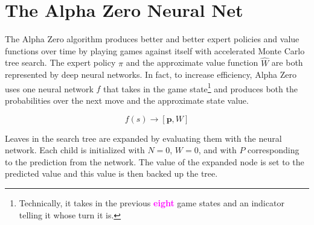 \documentclass[10pt]{article}
\newcommand{\todo}[1]{\textbf{\textcolor{magenta}{#1}}}
\newcommand{\vect}[1]{\boldsymbol{\mathbf{#1}}}
\begin{document}
\section*{The Alpha Zero Neural Net}

The Alpha Zero algorithm produces better and better expert policies and value functions over time by playing games against itself with accelerated Monte Carlo tree search.
The expert policy $\pi$ and the approximate value function $\hat{W}$ are both represented by deep neural networks.
In fact, to increase efficiency, Alpha Zero uses one neural network $f$ that takes in the game state\footnote{Technically, it takes in the previous \todo{eight} game states and an indicator telling it whose turn it is.} and produces both the probabilities over the next move and the approximate state value.

\[f(s) \rightarrow [\vect p, W]\]

Leaves in the search tree are expanded by evaluating them with the neural network.
Each child is initialized with $N = 0$, $W = 0$, and with $P$ corresponding to the prediction from the network.
The value of the expanded node is set to the predicted value and this value is then backed up the tree.
\end{document}
